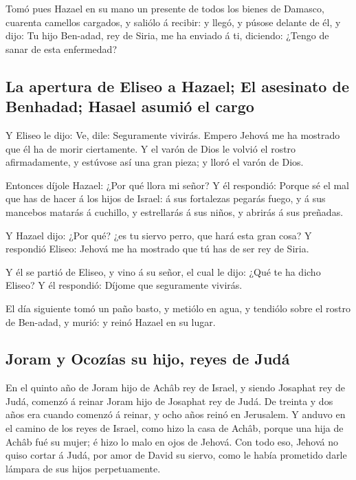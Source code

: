  Tomó pues Hazael en su mano un presente de todos los bienes
de Damasco, cuarenta camellos cargados, y saliólo á recibir: y llegó, y
púsose delante de él, y dijo: Tu hijo Ben-adad, rey de Siria, me ha
enviado á ti, diciendo: ¿Tengo de sanar de esta enfermedad?

\hypertarget{la-apertura-de-eliseo-a-hazael-el-asesinato-de-benhadad-hasael-asumiuxf3-el-cargo}{%
\subsection{La apertura de Eliseo a Hazael; El asesinato de Benhadad;
Hasael asumió el
cargo}\label{la-apertura-de-eliseo-a-hazael-el-asesinato-de-benhadad-hasael-asumiuxf3-el-cargo}}

 Y Eliseo le dijo: Ve, dile: Seguramente vivirás. Empero
Jehová me ha mostrado que él ha de morir ciertamente.  Y el
varón de Dios le volvió el rostro afirmadamente, y estúvose así una gran
pieza; y lloró el varón de Dios.

 Entonces díjole Hazael: ¿Por qué llora mi señor? Y él
respondió: Porque sé el mal que has de hacer á los hijos de Israel: á
sus fortalezas pegarás fuego, y á sus mancebos matarás á cuchillo, y
estrellarás á sus niños, y abrirás á sus preñadas.

 Y Hazael dijo: ¿Por qué? ¿es tu siervo perro, que hará
esta gran cosa? Y respondió Eliseo: Jehová me ha mostrado que tú has de
ser rey de Siria.

 Y él se partió de Eliseo, y vino á su señor, el cual le
dijo: ¿Qué te ha dicho Eliseo? Y él respondió: Díjome que seguramente
vivirás.

 El día siguiente tomó un paño basto, y metiólo en agua, y
tendiólo sobre el rostro de Ben-adad, y murió: y reinó Hazael en su
lugar.

\hypertarget{joram-y-ocozuxedas-su-hijo-reyes-de-juduxe1}{%
\subsection{Joram y Ocozías su hijo, reyes de
Judá}\label{joram-y-ocozuxedas-su-hijo-reyes-de-juduxe1}}

 En el quinto año de Joram hijo de Achâb rey de Israel, y
siendo Josaphat rey de Judá, comenzó á reinar Joram hijo de Josaphat rey
de Judá.  De treinta y dos años era cuando comenzó á
reinar, y ocho años reinó en Jerusalem.  Y anduvo en el
camino de los reyes de Israel, como hizo la casa de Achâb, porque una
hija de Achâb fué su mujer; é hizo lo malo en ojos de Jehová.
 Con todo eso, Jehová no quiso cortar á Judá, por amor de
David su siervo, como le había prometido darle lámpara de sus hijos
perpetuamente.

